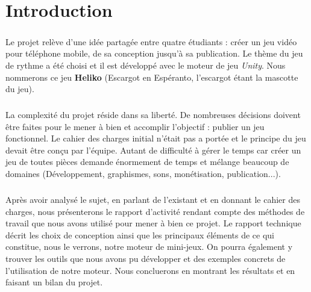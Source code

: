 \chapter{Introduction}

\paragraph{}
Le projet relève d'une idée partagée entre quatre étudiants : créer un jeu vidéo pour téléphone mobile, de sa conception jusqu'à sa publication. Le thème du jeu de rythme a été choisi et il est développé avec le moteur de jeu \textit{Unity}. Nous nommerons ce jeu \textbf{Heliko} (Escargot en Espéranto, l'escargot étant la mascotte du jeu).

\paragraph{}
La complexité du projet réside dans sa liberté. De nombreuses décisions doivent être faites pour le mener à bien et accomplir l'objectif : publier un jeu fonctionnel. Le cahier des charges initial n'était pas a portée et le principe du jeu devait être conçu par l'équipe. Autant de difficulté à gérer le temps car créer un jeu de toutes pièces demande énormement de temps et mélange beaucoup de domaines (Développement, graphismes, sons, monétisation, publication...).

\paragraph{}
Après avoir analysé le sujet, en parlant de l'existant et en donnant le cahier des charges, nous présenterons le rapport d'activité rendant compte des méthodes de travail que nous avons utilisé pour mener à bien ce projet. Le rapport technique décrit les choix de conception ainsi que les principaux éléments de ce qui constitue, nous le verrons, notre moteur de mini-jeux. On pourra également y trouver les outils que nous avons pu développer et des exemples concrets de l'utilisation de notre moteur. Nous concluerons en montrant les résultats et en faisant un bilan du projet.

